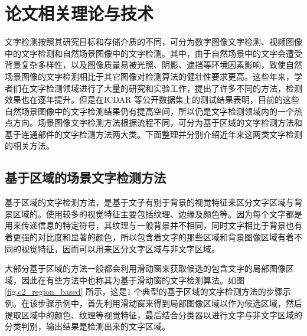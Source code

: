 ﻿%
%
%
%
%
%

\chapter{论文相关理论与技术}

    文字检测按照其研究目标和存储介质的不同，可分为数字图像文字检测、视频图像中的文字检测和自然场景图像中的文字检测。其中，由于自然场景中的文字会遭受背景复杂多样性，以及图像质量易被光照、阴影、遮挡等环境因素影响，致使自然场景图像的文字检测相比于其它图像对检测算法的健壮性要求更高。这些年来，学者们在文字检测领域进行了大量的研究和实验工作，提出了许多不同的方法，检测效果也在逐年提升。但是在ICDAR 等公开数据集上的测试结果表明，目前的这些自然场景图像中的文字检测结果仍有提高空间，所以仍是文字检测领域内的一个热点方向。场景图像文字检测方法根据流程不同，可分为基于区域的文字检测方法和基于连通部件的文字检测方法两大类。下面整理并分别介绍近年来这两类文字检测的相关方法。

    \section{基于区域的场景文字检测方法}

    基于区域的文字检测方法，是基于文子有别于背景的视觉特征来区分文字区域与背景区域的。使用较多的视觉特征主要包括纹理、边缘及颜色等。因为每个文字都是用来传递信息的特定符号，其纹理与一般背景并不相同，同时文字相比于背景也有着更强的对比度和显著的颜色，所以包含着文字的那些区域和背景图像区域有着不同的视觉特征，因而可以用来区分文字区域与非文字区域。

    大部分基于区域的方法一般都会利用滑动窗来获取候选的包含文字的局部图像区域，因此在有些方法中也称其为基于滑动窗的文字检测算法。如图\ref{fig.c2_region_based} 所示，这是1 个典型的基于区域的文字检测方法的步骤示例。在该步骤示例中，首先利用滑动窗来得到局部图像区域以作为候选区域，然后提取区域中的颜色、纹理等视觉特征，最后结合分类器以进行文字与非文字区域的分类判别，输出结果是检测出来的文字区域。

